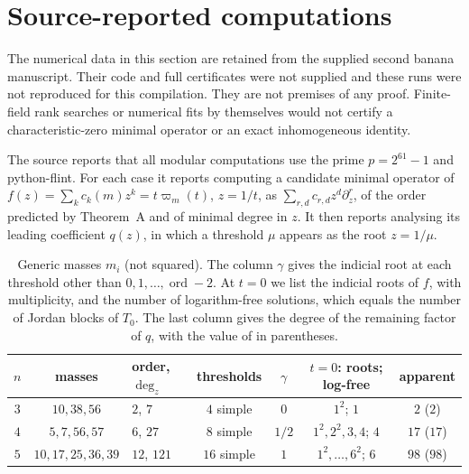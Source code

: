 \documentclass[11pt,a4paper]{article}
\theoremstyle{definition}
\theoremstyle{remark}
\numberwithin{equation}{section}
\DeclareMathOperator{\ord}{ord}
\begin{document}
\section{Source-reported computations}\label{bs:sec:numerics}
The numerical data in this section are retained from the supplied second
banana manuscript. Their code and full certificates were not supplied and
these runs were not reproduced for this compilation. They are not premises
of any proof. Finite-field rank searches or numerical fits by themselves
would not certify a characteristic-zero minimal operator or an exact
inhomogeneous identity.

The source reports that all modular computations use the prime $p=2^{61}-1$ and python-flint. For each case it reports computing a candidate minimal operator of $f(z)=\sum_kc_k(m)z^k=t\varpi_m(t)$, $z=1/t$, as $\sum_{r,d}c_{r,d}z^d\partial_z^r$, of the order predicted by Theorem~A and of minimal degree in $z$. It then reports analysing its leading coefficient $q(z)$, in which a threshold $\mu$ appears as the root $z=1/\mu$.

\begin{table}[ht]
\centering
\caption{Generic masses $m_i$ (not squared). The column $\gamma$ gives the indicial root at each threshold other than $0,1,\dots,\ord-2$. At $t=0$ we list the indicial roots of $f$, with multiplicity, and the number of logarithm-free solutions, which equals the number of Jordan blocks of $T_0$. The last column gives the degree of the remaining factor of $q$, with the value of \cite{LV23} in parentheses.}\label{bs:tab:generic}
\begin{tabular}{@{}cclcccc@{}}
\toprule
$n$ & masses & order, $\deg_z$ & thresholds & $\gamma$ & $t=0$: roots; log-free & apparent\\
\midrule
$3$ & $10,38,56$ & $2$, $7$ & $4$ simple & $0$ & $1^2$; $1$ & $2$ ($2$)\\
$4$ & $5,7,56,57$ & $6$, $27$ & $8$ simple & $1/2$ & $1^2,2^2,3,4$; $4$ & $17$ ($17$)\\
$5$ & $10,17,25,36,39$ & $12$, $121$ & $16$ simple & $1$ & $1^2,\dots,6^2$; $6$ & $98$ ($98$)\\
\bottomrule
\end{tabular}
\end{table}
\end{document}
